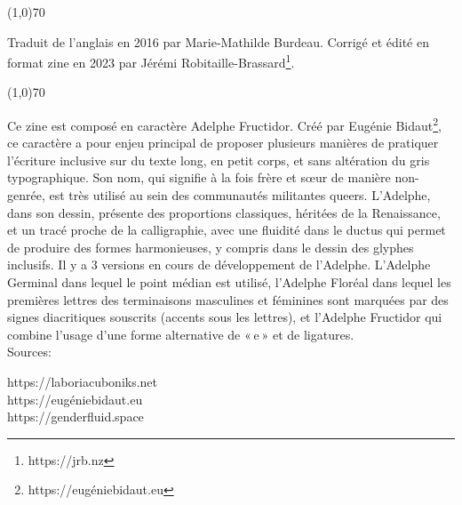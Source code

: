 \begin{center}
\line(1,0){70}
\end{center}
\singlespacing
\quote \footnotesize Traduit de l’anglais en 2016 par Marie-Mathilde Burdeau. Corrigé et édité en format zine en 2023 par Jérémi Robitaille-Brassard\footnote{\selectfont https://jrb.nz}.

\begin{center}
\line(1,0){70}
\end{center}

\footnotesize Ce zine est composé en caractère Adelphe Fructidor. Créé par Eugénie Bidaut\footnote{\selectfont https://eugéniebidaut.eu}, ce caractère a pour enjeu principal de proposer plusieurs manières de pratiquer l’écriture inclusive sur du texte long, en petit corps, et sans altération du gris typographique. Son nom, qui signifie à la fois frère et sœur de manière non-genrée, est très utilisé au sein des communautés militantes queers. L’Adelphe, dans son dessin, présente des proportions classiques, héritées de la Renaissance, et un tracé proche de la calligraphie, avec une fluidité dans le ductus qui permet de produire des formes harmonieuses, y compris dans le dessin des glyphes inclusifs. Il y a 3 versions en cours de développement de l’Adelphe. L’Adelphe Germinal dans lequel le point médian est utilisé, l’Adelphe Floréal dans lequel les premières lettres des terminaisons masculines et féminines sont marquées par des signes diacritiques souscrits (accents sous les lettres), et l’Adelphe Fructidor qui combine l’usage d’une forme alternative de « e » et de ligatures. \\

Sources:

{\selectfont https://laboriacuboniks.net \\ https://eugéniebidaut.eu \\ https://genderfluid.space }


